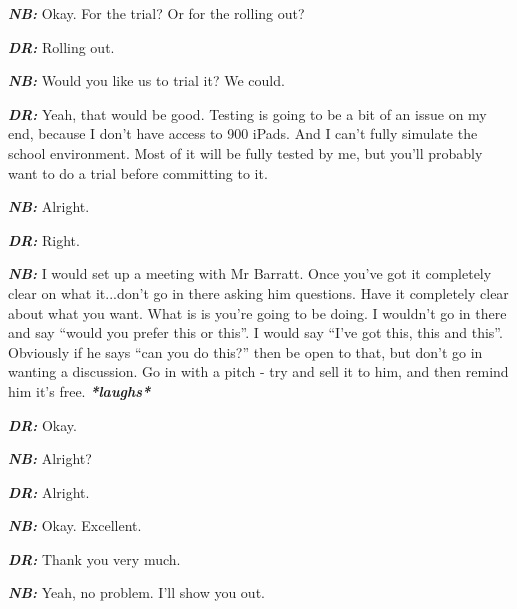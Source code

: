 \textit{\textbf{NB:}} Okay. For the trial? Or for the rolling out?

\textit{\textbf{DR:}} Rolling out.

\textit{\textbf{NB:}} Would you like us to trial it? We could.

\textit{\textbf{DR:}} Yeah, that would be good. Testing is going to be a bit of an issue on my end, because I don't have access to 900 iPads. And I can't fully simulate the school environment. Most of it will be fully tested by me, but you'll probably want to do a trial before committing to it.

\textit{\textbf{NB:}} Alright.

\textit{\textbf{DR:}} Right.

\textit{\textbf{NB:}} I would set up a meeting with Mr Barratt. Once you've got it completely clear on what it...don't go in there asking him questions. Have it completely clear about what you want. What is is you're going to be doing. I wouldn't go in there and say ``would you prefer this or this''. I would say ``I've got this, this and this''. Obviously if he says ``can you do this?'' then be open to that, but don't go in wanting a discussion. Go in with a pitch - try and sell it to him, and then remind him it's free. \textit{\textbf{*laughs*}}

\textit{\textbf{DR:}} Okay.

\textit{\textbf{NB:}} Alright?

\textit{\textbf{DR:}} Alright.

\textit{\textbf{NB:}} Okay. Excellent.

\textit{\textbf{DR:}} Thank you very much.

\textit{\textbf{NB:}} Yeah, no problem. I'll show you out.

